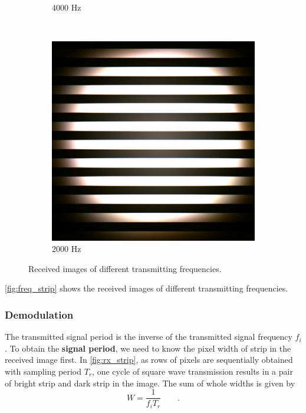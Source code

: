 \begin{figure}[!htb]
\begin{subfigure}[h]{0.12\textwidth}
	\caption{4000 Hz}
	\end{subfigure}
	~	
	\begin{subfigure}[h]{0.12\textwidth}
	\includegraphics[width=\textwidth]{fig/strip3.png}
	\caption{2000 Hz}
	\end{subfigure}
\caption{Received images of different transmitting frequencies.}
\label{fig:freq_strip}
\end{figure}
\autoref{fig:freq_strip} shows the received images of different transmitting frequencies.

\subsubsection{Demodulation}
\label{sec:period}
The transmitted signal period is the inverse of the transmitted signal frequency $f_i$. To obtain the \textbf{signal period}, we need to know the pixel width of strip in the received image first. In \autoref{fig:rx_strip}, as rows of pixels are sequentially obtained with sampling period $T_r$, one cycle of square wave transmission results in a pair of bright strip and dark strip in the image. The sum of whole widths is given by
\begin{equation}
W= \frac{1}{f_i T_r} \qquad \textrm{.}
\label{eq:widthtofreq}
\end{equation}

